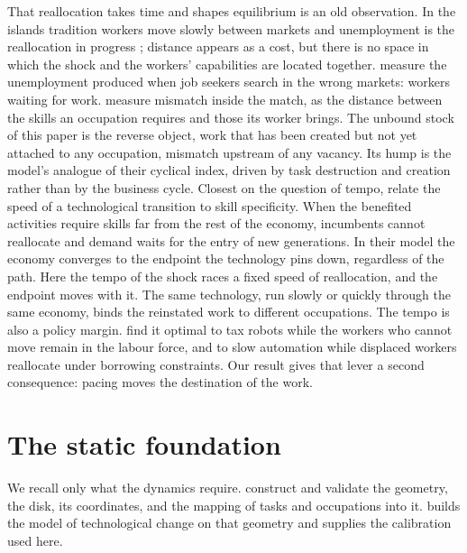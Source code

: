 \documentclass[12pt, a4paper]{article}
\begin{document}
That reallocation takes time and shapes equilibrium is an old
observation. In the islands tradition workers move slowly between
markets and unemployment is the reallocation in progress
\parencite{lucas1974equilibrium, alvarez2011search}; distance appears as
a cost, but there is no space in which the shock and the workers'
capabilities are located together. \textcite{csahin2014mismatch} measure
the unemployment produced when job seekers search in the wrong markets:
workers waiting for work. \textcite{guvenen2020multidimensional}
measure mismatch inside the match, as the distance between the skills an
occupation requires and those its worker brings. The unbound stock of
this paper is the reverse
object, work that has been created but not yet attached to any
occupation, mismatch upstream of any vacancy. Its hump is the model's
analogue of their cyclical index, driven by task destruction and
creation rather than by the business cycle. Closest on the question of
tempo, \textcite{adao2024fast} relate the speed of a technological
transition to skill specificity. When the benefited activities require
skills far from the rest of the economy, incumbents cannot reallocate
and demand waits for the entry of new generations. In their model the
economy converges to the endpoint the technology pins down, regardless
of the path. Here the tempo of the shock races a fixed speed of
reallocation, and the endpoint moves with it. The same technology, run
slowly or quickly through the same economy, binds the reinstated work
to different occupations. The tempo is also a policy margin.
\textcite{guerreiro2022should} find it optimal to tax robots while the
workers who cannot move remain in the labour force, and
\textcite{beraja2025inefficient} to slow automation while displaced
workers reallocate under borrowing constraints. Our result gives that
lever a second consequence: pacing moves the destination of the work.

\section{The static foundation}
\label{sec:foundation}

We recall only what the dynamics require. \textcite{storck2026geometry}
construct and validate the geometry, the disk, its coordinates, and the
mapping of tasks and occupations into it. \textcite{storck2026fields}
builds the model of technological change on that geometry and supplies
the calibration used here.
\end{document}
